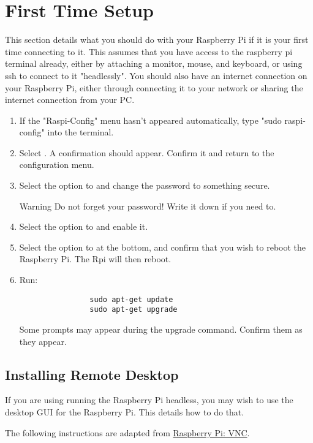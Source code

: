 \documentclass{article}
\begin{document}
		\section{First Time Setup}
		This section details what you should do with your Raspberry Pi if it is your first time connecting to it. This assumes that you have access to the raspberry pi terminal already, either by attaching a monitor, mouse, and keyboard, or using ssh to connect to it "headlessly". You should also have an internet connection on your Raspberry Pi, either through connecting it to your network or sharing the internet connection from your PC.
		\begin{enumerate}
			\item If the "Raspi-Config" menu hasn't appeared automatically, type "sudo raspi-config" into the terminal.
			\item Select . A confirmation should appear. Confirm it and return to the configuration menu.
			\item Select the option to  and change the password to something secure. 
			\begin{bclogo}{Warning}
				Do not forget your password! Write it down if you need to.
			\end{bclogo}
			\item Select the option to  and enable it.
			\item Select the option to  at the bottom, and confirm that you wish to reboot the Raspberry Pi. The Rpi will then reboot.
			\item Run:
			\begin{verbatim}
				sudo apt-get update
				sudo apt-get upgrade
			\end{verbatim}
			Some prompts may appear during the upgrade command. Confirm them as they appear.
		\end{enumerate}
		\subsection{Installing Remote Desktop}
		If you are using running the Raspberry Pi headless, you may wish to use the desktop GUI for the Raspberry Pi. This details how to do that.
		
		The following instructions are adapted from \href{https://www.raspberrypi.org/documentation/remote-access/vnc/README.md}{Raspberry Pi: VNC}.
		
\end{document}
